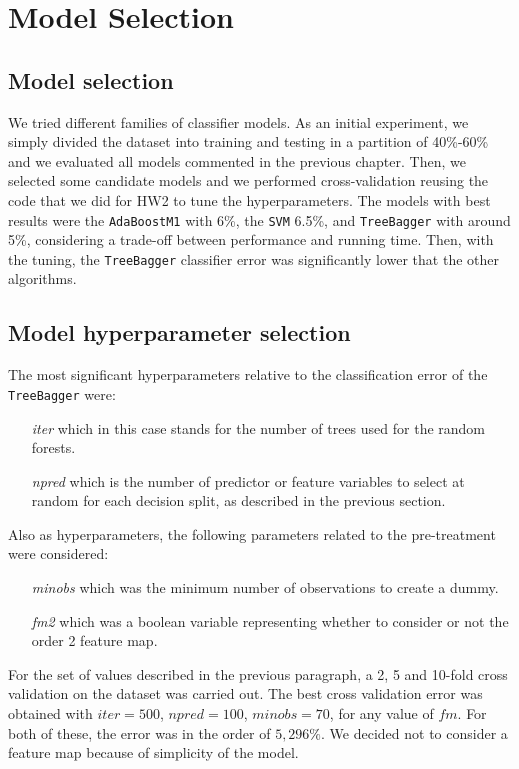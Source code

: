\chapter{Model Selection}
\label{ch:ch4cv}

\section{Model selection}
We tried different families of classifier models. As an initial experiment, we simply divided the dataset into training and testing in a partition of 40\%-60\% and we evaluated all models commented in the previous chapter. Then, we selected some candidate models and we performed cross-validation reusing the code that we did for HW2 to tune the hyperparameters. The models with best results were the \verb|AdaBoostM1| with 6\%, the \verb|SVM| 6.5\%, and \verb|TreeBagger| with around 5\%, considering a trade-off between performance and running time. Then, with the tuning, the \verb|TreeBagger| classifier error was significantly lower that the other algorithms.

\section{Model hyperparameter selection}
The most significant hyperparameters relative to the classification error of the \verb|TreeBagger| were: 
\begin{itemize}
    \item[\textit{iter}] which in this case stands for the number of trees used for the random forests.
    \item[\textit{npred}] which is the number of predictor or feature variables to select at random for each decision split, as described in the previous section.
\end{itemize}
Also as hyperparameters, the following parameters related to the pre-treatment were considered: 
\begin{itemize}
    \item[\textit{minobs}] which was the minimum number of observations to create a dummy.
    \item[\textit{fm2}] which was a boolean variable representing whether to consider or not the order 2 feature map.
\end{itemize}

For the set of values described in the previous paragraph, a 2, 5 and 10-fold cross validation on the dataset was carried out. The best cross validation error was obtained with $iter = 500$, $npred = 100$, $minobs=70$, for any value of $fm$. For both of these, the error was in the order of $5,296\%$. We decided not to consider a feature map because of simplicity of the model. 

